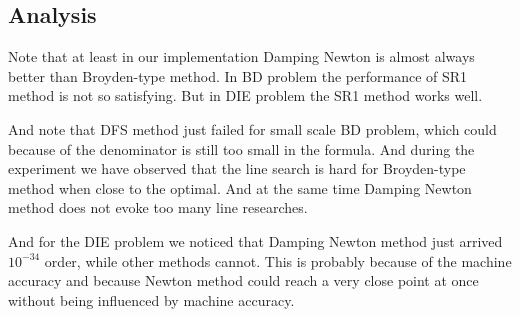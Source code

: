 \documentclass{article}
\begin{document}
\subsection{Analysis}
Note that at least in our implementation Damping Newton is almost always better than Broyden-type method. In BD problem the performance of SR1 method is not so satisfying. But in DIE problem the SR1 method works well. 

And note that DFS method just failed for small scale BD problem, which could because of the denominator is still too small in the formula. And during the experiment we have observed that the line search is hard for Broyden-type method when close to the optimal.   And at the same time Damping Newton method does not evoke too many line researches.

And for the DIE problem we noticed that Damping Newton method just arrived $10^{-34}$ order, while other methods cannot. This is probably because of the machine accuracy and because Newton method could reach a very close point at once without being influenced by machine accuracy.
		 
\end{document}
